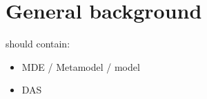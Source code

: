 \section{General background}

should contain:
\begin{itemize}
	\item MDE / Metamodel / model
	\item DAS
\end{itemize}
